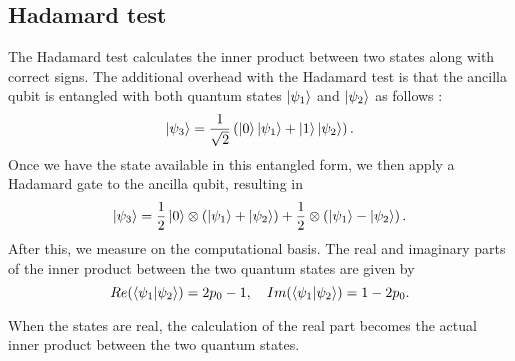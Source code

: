 \documentclass[10pt]{article}
\begin{document}
	\subsection{\label{app: Hadamard}Hadamard test}
	
	The Hadamard test calculates the inner product between two states along with correct signs. The additional overhead with the Hadamard test is that the ancilla qubit is entangled with both quantum states $\ket{\psi_1}$ and $\ket{\psi_2}$ as follows \citep{Schuld2021QML}:
	\begin{equation}
		\ket{\psi_3}=\frac{1}{\sqrt{2}}\left(\ket{0}\ket{\psi_1}+\ket{1}\ket{\psi_2}\right).
	\end{equation}
	Once we have the state available in this entangled form, we then apply a Hadamard gate to the ancilla qubit, resulting in
	\begin{equation}
		\ket{\psi_3}=\frac{1}{2} \ket{0} \otimes \left(\ket{\psi_1}+\ket{\psi_2}\right)+\frac{1}{2}\otimes \left(\ket{\psi_1}-\ket{\psi_2}\right).
	\end{equation}
	After this, we measure on the computational basis. The real and imaginary parts of the inner product between the two quantum states are given by
	\begin{equation}
		Re(\braket{\psi_1|\psi_2})=2p_0 - 1,\quad Im(\braket{\psi_1|\psi_2})=1-2p_0.
	\end{equation}
	
	When the states are real, the calculation of the real part becomes the actual inner product between the two quantum states.
\end{document}
